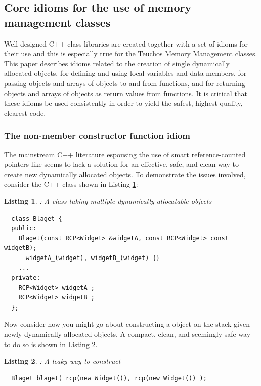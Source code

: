 \documentclass[pdf,ps2pdf,11pt]{SANDreport}
\newtheorem{listing}{Listing}
\begin{document}
%
{}\subsection{Core idioms for the use of memory management classes}
\label{sec:idioms}
%

Well designed C++ class libraries are created together with a set of
idioms for their use and this is especially true for the Teuchos
Memory Management classes.  This paper describes idioms related to the
creation of single dynamically allocated objects, for defining and
using local variables and data members, for passing objects and arrays
of objects to and from functions, and for returning objects and arrays
of objects as return values from functions.  It is critical that these
idioms be used consistently in order to yield the safest, highest
quality, clearest code.


%
{}\subsubsection{The non-member constructor function idiom}
\label{sec:nonmember-constructor-idiom}
%

The mainstream C++ literature espousing the use of smart
reference-counted pointers like {} seems to
lack a solution for an effective, safe, and clean way to create new
dynamically allocated objects.  To demonstrate the issues involved,
consider the C++ class {} shown in Listing
{}\ref{listing:BlagetClass}:

\begin{listing}: A class taking multiple dynamically allocatable objects \\
\label{listing:BlagetClass}
{\small\begin{verbatim}
  class Blaget {
  public:
    Blaget(const RCP<Widget> &widgetA, const RCP<Widget> const widgetB);
      widgetA_(widget), widgetB_(widget) {}
    ...
  private:
    RCP<Widget> widgetA_;
    RCP<Widget> widgetB_;
  };
\end{verbatim}}
\end{listing}

Now consider how you might go about constructing a {}
object on the stack given newly dynamically allocated
{} objects.  A compact, clean, and seemingly safe way
to do so is shown in Listing {}\ref{listing:BlagetConstruct1}.

\begin{listing}: A leaky way to construct \\
\label{listing:BlagetConstruct1}
{\small\begin{verbatim}
  Blaget blaget( rcp(new Widget()), rcp(new Widget()) );
\end{verbatim}}
\end{listing}
\end{document}
